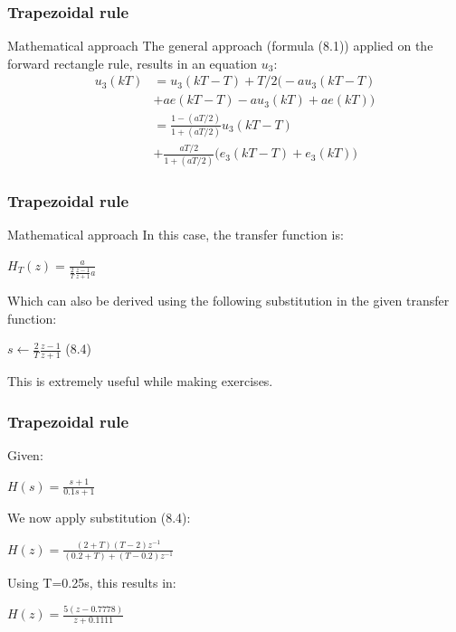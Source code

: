 \begin{frame}
	\frametitle{Trapezoidal rule}
	\begin{block}{Mathematical approach}
		The general approach (formula (8.1)) applied on the forward rectangle rule, results in an equation $u_3$:
		\begin{align*}
		u_3(kT)& =u_3(kT - T) + T/2\big(-au_3(kT - T)\\
		& + ae(kT - T) - au_3(kT) + ae(kT)\big)\\
		& =\frac{1-(aT/2)}{1 + (aT/2)}u_3(kT - T)\\
		& +\frac{aT/2}{1 + (aT/2)} \big(e_3(kT - T) + e_3(kT)\big)
		\end{align*}
	\end{block}
\end{frame}

\begin{frame}
	\frametitle{Trapezoidal rule}
	\begin{block}{Mathematical approach}
		In this case, the transfer function is:
		\begin{center}
			$H_T(z) = \frac{a}{\frac{2}{T}\frac{z-1}{z+1}a }$
		\end{center}
		Which can also be derived using the following substitution in the given transfer function:
		\begin{center}
			$s \gets \frac{2}{T} \frac{z-1}{z+1}$ (8.4)
		\end{center}
		This is extremely useful while making exercises.
	\end{block}
\end{frame}

\begin{frame}
	\frametitle{Trapezoidal rule}
	\begin{example}
		Given:
		\begin{center}
			$H(s) = \frac{s + 1}{0.1s + 1}$
		\end{center}
		We now apply substitution (8.4):
		\begin{center}
			$H(z) = \frac{(2 + T)(T - 2)z^{-1}}{(0.2 + T) + (T - 0.2)z^{-1}}$
		\end{center}
		Using T=0.25s, this results in:
		\begin{center}
			$H(z) = \frac{5(z - 0.7778)}{z + 0.1111}$
		\end{center}
	\end{example}
\end{frame}

